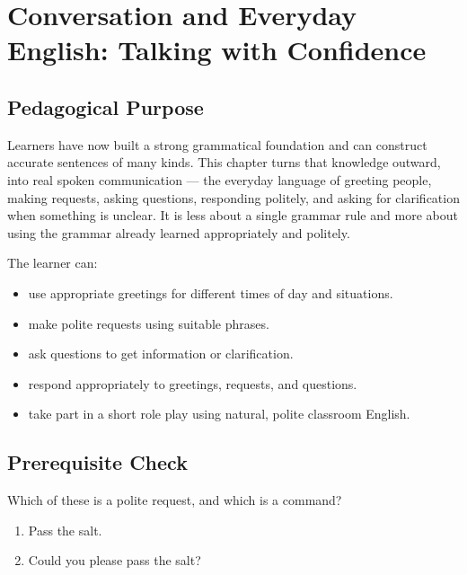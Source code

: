 
\chapter{Conversation and Everyday English: Talking with Confidence}

\section{Pedagogical Purpose}
Learners have now built a strong grammatical foundation and can construct accurate sentences of many kinds. This chapter turns that knowledge outward, into real spoken communication — the everyday language of greeting people, making requests, asking questions, responding politely, and asking for clarification when something is unclear. It is less about a single grammar rule and more about using the grammar already learned appropriately and politely.

\begin{learningobjectives}
The learner can:
\begin{itemize}
    \item use appropriate greetings for different times of day and situations.
    \item make polite requests using suitable phrases.
    \item ask questions to get information or clarification.
    \item respond appropriately to greetings, requests, and questions.
    \item take part in a short role play using natural, polite classroom English.
\end{itemize}
\end{learningobjectives}

\section{Prerequisite Check}
\begin{quickcheck}
Which of these is a polite request, and which is a command?

\begin{enumerate}
    \item Pass the salt.
    \item Could you please pass the salt?
\end{enumerate}
\end{quickcheck}

